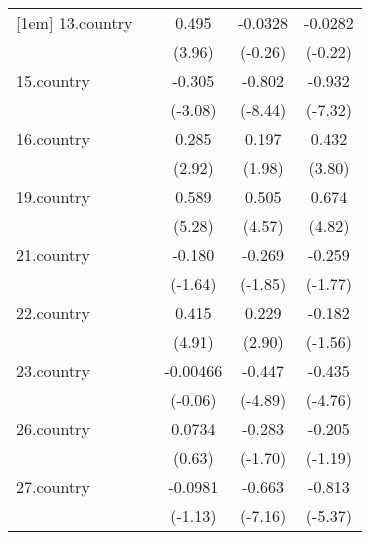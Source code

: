 {\begin{tabular}{l*{4}{c}}
[1em]
13.country  &                     &       0.495\sym{***}&     -0.0328         &     -0.0282         \\
            &                     &      (3.96)         &     (-0.26)         &     (-0.22)         \\
[1em]
15.country  &                     &      -0.305\sym{**} &      -0.802\sym{***}&      -0.932\sym{***}\\
            &                     &     (-3.08)         &     (-8.44)         &     (-7.32)         \\
[1em]
16.country  &                     &       0.285\sym{**} &       0.197\sym{*}  &       0.432\sym{***}\\
            &                     &      (2.92)         &      (1.98)         &      (3.80)         \\
[1em]
19.country  &                     &       0.589\sym{***}&       0.505\sym{***}&       0.674\sym{***}\\
            &                     &      (5.28)         &      (4.57)         &      (4.82)         \\
[1em]
21.country  &                     &      -0.180         &      -0.269         &      -0.259         \\
            &                     &     (-1.64)         &     (-1.85)         &     (-1.77)         \\
[1em]
22.country  &                     &       0.415\sym{***}&       0.229\sym{**} &      -0.182         \\
            &                     &      (4.91)         &      (2.90)         &     (-1.56)         \\
[1em]
23.country  &                     &    -0.00466         &      -0.447\sym{***}&      -0.435\sym{***}\\
            &                     &     (-0.06)         &     (-4.89)         &     (-4.76)         \\
[1em]
26.country  &                     &      0.0734         &      -0.283         &      -0.205         \\
            &                     &      (0.63)         &     (-1.70)         &     (-1.19)         \\
[1em]
27.country  &                     &     -0.0981         &      -0.663\sym{***}&      -0.813\sym{***}\\
            &                     &     (-1.13)         &     (-7.16)         &     (-5.37)         \\

\end{tabular}}
